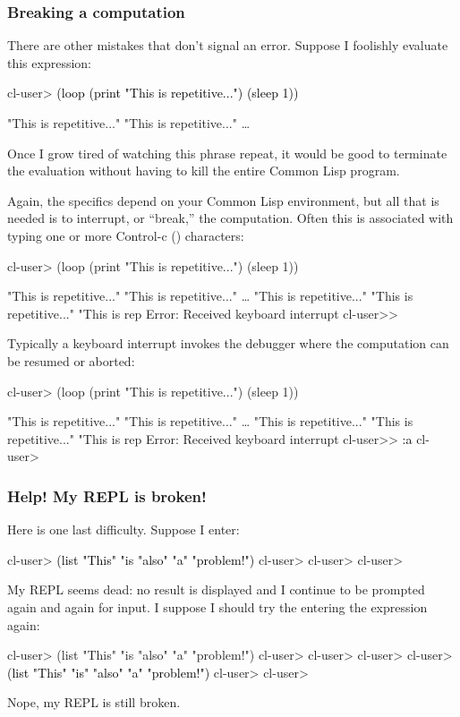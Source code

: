 \documentclass[10pt,twoside,english,pdftex]{article}
\begin{document}
\subsubsection*{Breaking a computation}

There are other mistakes that don't signal an error.  Suppose I
foolishly evaluate this expression:
%
\W\supp
\begin{example}
\textcolor{darkergray}{%
  cl-user> \textcolor{black}{(loop (print "This is repetitive...") (sleep 1))}

  "This is repetitive..." 
  "This is repetitive..." 
     \textrm{\ldots{}}}
\end{example}
%
Once I grow tired of watching this phrase repeat, it would be good to
terminate the evaluation without having to kill the entire Common Lisp
program.

Again, the specifics depend on your Common Lisp environment, but all that is
needed is to interrupt, or ``break,'' the computation.  Often this is
associated with typing one or more Control-c () characters:
%
\W\supp
\begin{example}
\textcolor{darkergray}{%
  cl-user> (loop (print "This is repetitive...") (sleep 1))

  "This is repetitive..." 
  "This is repetitive..." 
     \textrm{\ldots{}}
  "This is repetitive..." 
  "This is repetitive..." 
  "This is rep\textcolor{black}{}
  Error: Received keyboard interrupt 
  cl-user>>}
\end{example}
%
Typically a keyboard interrupt invokes the debugger where the computation
can be resumed or aborted:
%
\W\supp\notpretop
\begin{example}
\textcolor{darkergray}{%
  cl-user> (loop (print "This is repetitive...") (sleep 1))

  "This is repetitive..." 
  "This is repetitive..." 
     \textrm{\ldots{}}
  "This is repetitive..." 
  "This is repetitive..." 
  "This is rep
  Error: Received keyboard interrupt 
  cl-user>> \textcolor{black}{:a}
  cl-user>}
\end{example}

\subsubsection*{Help! My REPL is broken!}

Here is one last difficulty.  Suppose I enter:
%
\W\supp
\begin{example}
\textcolor{darkergray}{%
  cl-user> \textcolor{black}{(list "This" "is "also" "a" "problem!")}
  cl-user>
  cl-user>
  cl-user>}
\end{example}
%
My REPL seems dead: no result is displayed and I continue to be prompted again
and again for input.  I suppose I should try the entering the expression
again:
%
\W\supp\notpretop
\begin{example}
\textcolor{darkergray}{%
  cl-user> (list "This" "is "also" "a" "problem!")
  cl-user>
  cl-user>
  cl-user>
  cl-user> \textcolor{black}{(list "This" "is" "also" "a" "problem!")}
  cl-user>
  cl-user>}
\end{example}
%
Nope, my REPL is still broken.
\end{document}
